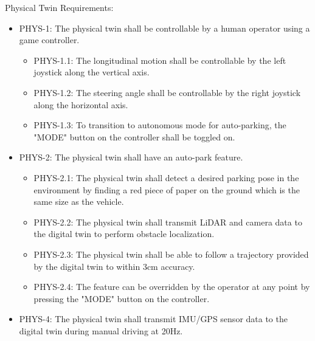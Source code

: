 Physical Twin Requirements:
\begin{itemize}
    \item PHYS-1: The physical twin shall be controllable by a human operator using a game controller.
    \begin{itemize}
        \item PHYS-1.1: The longitudinal motion shall be controllable by the left joystick along the vertical axis.
        \item PHYS-1.2: The steering angle shall be controllable by the right joystick along the horizontal axis.
        \item PHYS-1.3: To transition to autonomous mode for auto-parking, the "MODE" button on the controller shall be toggled on.
    \end{itemize}
    \item PHYS-2: The physical twin shall have an auto-park feature.
    \begin{itemize}
        \item PHYS-2.1: The physical twin shall detect a desired parking pose in the environment by finding a red piece of paper on the ground which is the same size as the vehicle.
        \item PHYS-2.2: The physical twin shall transmit LiDAR and camera data to the digital twin to perform obstacle localization.
        \item PHYS-2.3: The physical twin shall be able to follow a trajectory provided by the digital twin to within 3cm accuracy.
        \item PHYS-2.4: The feature can be overridden by the operator at any point by pressing the "MODE" button on the controller.
    \end{itemize}
    \item PHYS-4: The physical twin shall transmit IMU/GPS sensor data to the digital twin during manual driving at 20Hz.
\end{itemize}

